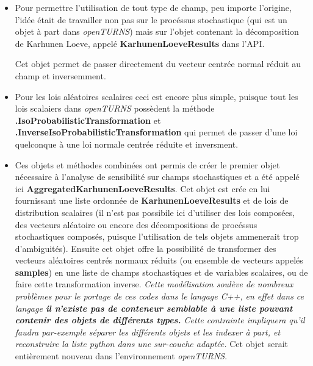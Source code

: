 \documentclass[a4paper,10pt]{article}
\begin{document}
\begin{itemize}
  \item Pour permettre l'utilisation de tout type de champ, peu importe l'origine, l'idée était de travailler non pas sur le procéssus stochastique (qui est un objet à part dans \textit{openTURNS}) mais sur l'objet contenant la décomposition de Karhunen Loeve, appelé \textbf{KarhunenLoeveResults} dans l'API. 
  
  Cet objet permet de passer directement du vecteur centrée normal réduit au champ et inversemment. 
  \item Pour les lois aléatoires scalaires ceci est encore plus simple, puisque tout les lois scalaiers dans \textit{openTURNS} possèdent la méthode \textbf{.IsoProbabilisticTransformation} et \textbf{.InverseIsoProbabilisticTransformation} qui permet de passer d'une loi quelconque à une loi normale centrée réduite et inversment.
  
  \item Ces objets et méthodes combinées ont permis de créer le premier objet nécessaire à l'analyse de sensibilité sur champs stochastiques et a été appelé ici \textbf{AggregatedKarhunenLoeveResults}. Cet objet est crée en lui fournissant une liste ordonnée de \textbf{KarhunenLoeveResults} et de lois de distribution scalaires (il n'est pas possibile ici d'utiliser des lois composées, des vecteurs aléatoire ou encore des décompositions de procéssus stochastiques composés, puisque l'utilisation de tels objets ammenerait trop d'ambiguités). Ensuite cet objet offre la possibilité de transformer des vecteurs aléatoires centrés normaux réduits (ou ensemble de vecteurs appelés \textbf{samples}) en une liste de champs stochastiques et de variables scalaires, ou de faire cette transformation inverse. \emph{Cette modélisation soulève de nombreux problèmes pour le portage de ces codes dans le langage C++, en effet dans ce langage \textbf{il n'existe pas de conteneur semblable à une liste pouvant contenir des objets de différents types.} Cette contrainte impliquera qu'il faudra par-exemple séparer les différents objets et les indexer à part, et reconstruire la liste python dans une sur-couche adaptée.} 
  Cet objet serait entièrement nouveau dans l'environnement \textit{openTURNS}.
  

\end{itemize}
\end{document}
